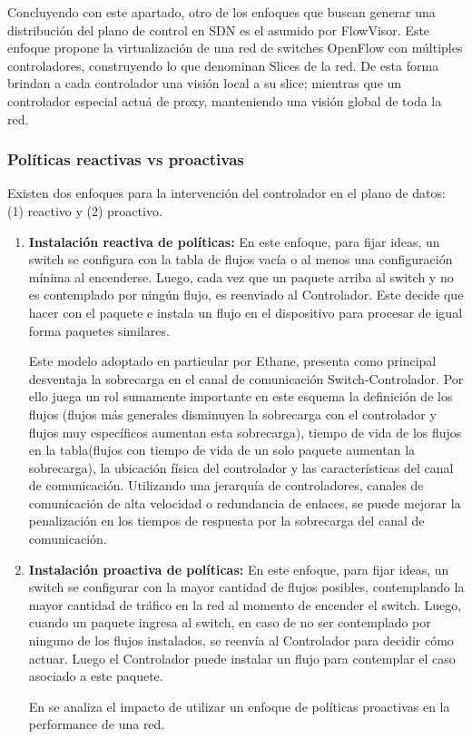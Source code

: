 Concluyendo con este apartado, otro de los enfoques que buscan generar una distribución del plano de control en SDN es el asumido por FlowVisor\cite{sherwood2010carving}. Este enfoque propone la virtualización de una red de switches OpenFlow con múltiples controladores, construyendo lo que denominan Slices de la red. De esta forma brindan a cada controlador una visión local a su slice; mientras que un controlador especial actuá de proxy, manteniendo una visión global de toda la red.

\subsubsection{Políticas reactivas vs proactivas}
Existen dos enfoques para la intervención del controlador en el plano de datos: (1) reactivo y (2) proactivo.

\begin{enumerate}
\item \textbf{Instalación reactiva de políticas:} En este enfoque, para fijar ideas, un switch se configura con la tabla de flujos vac\'ia o al menos una configuración mínima al encenderse. Luego, cada vez que un paquete arriba al switch y no es contemplado por ning\'un flujo, es reenviado al Controlador. Este decide que hacer con el paquete e instala un flujo en el dispositivo para procesar de igual forma paquetes similares.

Este modelo adoptado en particular por Ethane\cite{casado2007ethane}, presenta como principal desventaja la sobrecarga en el canal de comunicación Switch-Controlador. Por ello juega un rol sumamente importante en este esquema la definición de los flujos (flujos m\'as generales disminuyen la sobrecarga con el controlador y flujos muy específicos aumentan esta sobrecarga), tiempo de vida de los flujos en la tabla(flujos con tiempo de vida de un solo paquete aumentan la sobrecarga), la ubicación física del controlador y las características del canal de comunicación. Utilizando una jerarquía de controladores, canales de comunicación de alta velocidad o redundancia de enlaces, se puede mejorar la penalizaci\'on en los tiempos de respuesta por la sobrecarga del canal de comunicación. 

\item \textbf{Instalación proactiva de políticas:} En este enfoque, para fijar ideas, un switch se configurar con la mayor cantidad de flujos posibles, contemplando la mayor cantidad de tr\'afico en la red al momento de encender el switch. Luego, cuando un paquete ingresa al switch, en caso de no ser contemplado por ninguno de los flujos instalados, se reenvía al Controlador para decidir c\'omo actuar. Luego el Controlador puede instalar un flujo para contemplar el caso asociado a este paquete. 

En \cite{yu2011scalable} se analiza el impacto de utilizar un enfoque de políticas proactivas en la performance de una red.  

\end{enumerate} 

